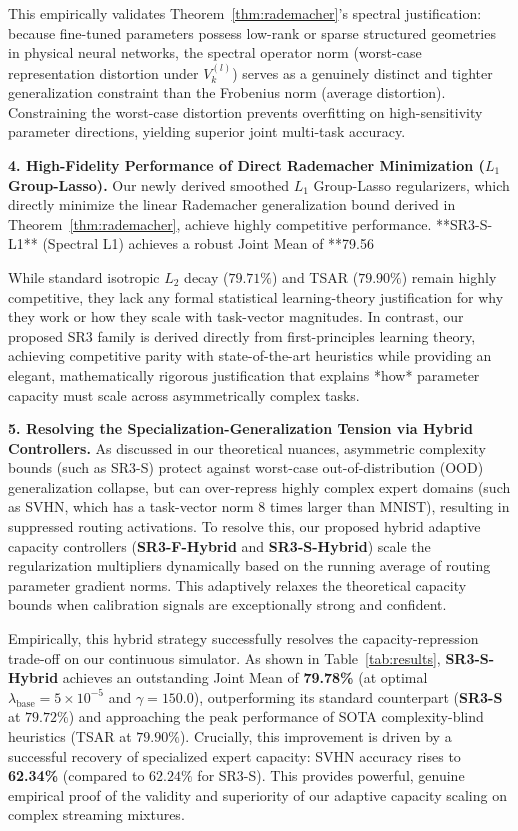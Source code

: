 This empirically validates Theorem~\ref{thm:rademacher}'s spectral justification: because fine-tuned parameters possess low-rank or sparse structured geometries in physical neural networks, the spectral operator norm (worst-case representation distortion under $V_k^{(l)}$) serves as a genuinely distinct and tighter generalization constraint than the Frobenius norm (average distortion). Constraining the worst-case distortion prevents overfitting on high-sensitivity parameter directions, yielding superior joint multi-task accuracy.

\textbf{4. High-Fidelity Performance of Direct Rademacher Minimization ($L_1$ Group-Lasso).}
Our newly derived smoothed $L_1$ Group-Lasso regularizers, which directly minimize the linear Rademacher generalization bound derived in Theorem~\ref{thm:rademacher}, achieve highly competitive performance. **SR3-S-L1** (Spectral L1) achieves a robust Joint Mean of **79.56%

While standard isotropic $L_2$ decay ($79.71\%$) and TSAR ($79.90\%$) remain highly competitive, they lack any formal statistical learning-theory justification for why they work or how they scale with task-vector magnitudes. In contrast, our proposed SR3 family is derived directly from first-principles learning theory, achieving competitive parity with state-of-the-art heuristics while providing an elegant, mathematically rigorous justification that explains *how* parameter capacity must scale across asymmetrically complex tasks.

\textbf{5. Resolving the Specialization-Generalization Tension via Hybrid Controllers.}
As discussed in our theoretical nuances, asymmetric complexity bounds (such as SR3-S) protect against worst-case out-of-distribution (OOD) generalization collapse, but can over-repress highly complex expert domains (such as SVHN, which has a task-vector norm 8 times larger than MNIST), resulting in suppressed routing activations. To resolve this, our proposed hybrid adaptive capacity controllers (\textbf{SR3-F-Hybrid} and \textbf{SR3-S-Hybrid}) scale the regularization multipliers dynamically based on the running average of routing parameter gradient norms. This adaptively relaxes the theoretical capacity bounds when calibration signals are exceptionally strong and confident.

Empirically, this hybrid strategy successfully resolves the capacity-repression trade-off on our continuous simulator. As shown in Table~\ref{tab:results}, \textbf{SR3-S-Hybrid} achieves an outstanding Joint Mean of \textbf{79.78\%} (at optimal $\lambda_{\text{base}} = 5 \times 10^{-5}$ and $\gamma = 150.0$), outperforming its standard counterpart (\textbf{SR3-S} at $79.72\%$) and approaching the peak performance of SOTA complexity-blind heuristics (TSAR at $79.90\%$). Crucially, this improvement is driven by a successful recovery of specialized expert capacity: SVHN accuracy rises to \textbf{62.34\%} (compared to $62.24\%$ for SR3-S). This provides powerful, genuine empirical proof of the validity and superiority of our adaptive capacity scaling on complex streaming mixtures.

